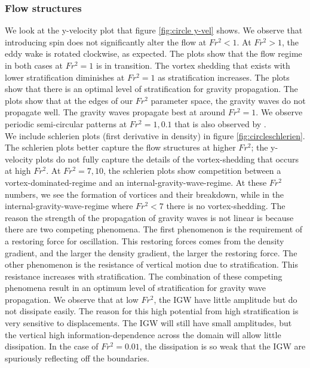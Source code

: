 \subsubsection{Flow structures}
We look at the y-velocity plot that figure \ref{fig:circle y-vel} shows. We observe that introducing spin does not significantly alter the flow at $Fr^2 < 1$. At $Fr^2 > 1$, the eddy wake is rotated clockwise, as expected. The plots show that the flow regime in both cases at $Fr^2 = 1$ is in transition. The vortex shedding that exists with lower stratification diminishes at $Fr^2 = 1$ as stratification increases. The plots show that there is an optimal level of stratification for gravity propagation. The plots show that at the edges of our $Fr^2$ parameter space, the gravity waves do not propagate well. The gravity waves propagate best at around $Fr^2 = 1$. We observe periodic semi-circular patterns at $Fr^2 = 1, 0.1$ that is also observed by \cite{ortiz-tarin_stratified_2019}.\\ 
We include schlerien plots (first derivative in density) in figure \ref{fig:circleschlerien}. The schlerien plots better capture the flow structures at higher $Fr^2$; the y-velocity plots do not fully capture the details of the vortex-shedding that occurs at high $Fr^2$. At $Fr^2 = 7, 10$, the schlerien plots show competition between a vortex-dominated-regime and an internal-gravity-wave-regime. At these $Fr^2$ numbers, we see the formation of vortices and their breakdown, while in the internal-gravity-wave-regime where $Fr^2 < 7$ there is no vortex-shedding. 
The reason the strength of the propagation of gravity waves is not linear is because there are two competing phenomena. The first phenomenon is the requirement of a restoring force for oscillation. This restoring forces comes from the density gradient, and the larger the density gradient, the larger the restoring force. The other phenomenon is the resistance of vertical motion due to stratification. This resistance increases with stratification. The combination of these competing phenomena result in an optimum level of stratification for gravity wave propagation. We observe that at low $Fr^2$, the IGW have little amplitude but do not dissipate easily. The reason for this high potential from high stratification is very sensitive to displacements. The IGW will still have small amplitudes, but the vertical high information-dependence across the domain will allow little dissipation. In the case of $Fr^2 = 0.01$, the dissipation is so weak that the IGW are spuriously reflecting off the boundaries.  
